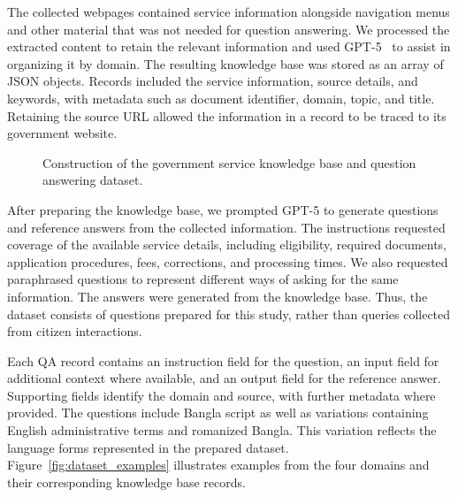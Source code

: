 \documentclass[10pt,journal,compsoc]{IEEEtran}
\begin{document}
The collected webpages contained service information alongside navigation menus and other material that was not needed for question answering. We processed the extracted content to retain the relevant information and used GPT-5~\cite{openai2025gpt5} to assist in organizing it by domain. The resulting knowledge base was stored as an array of JSON objects. Records included the service information, source details, and keywords, with metadata such as document identifier, domain, topic, and title. Retaining the source URL allowed the information in a record to be traced to its government website.

\begin{figure}[!t]
\centering
\caption{Construction of the government service knowledge base and question answering dataset.}
\label{fig:data_preparation}
\end{figure}

After preparing the knowledge base, we prompted GPT-5 to generate questions and reference answers from the collected information. The instructions requested coverage of the available service details, including eligibility, required documents, application procedures, fees, corrections, and processing times. We also requested paraphrased questions to represent different ways of asking for the same information. The answers were generated from the knowledge base. Thus, the dataset consists of questions prepared for this study, rather than queries collected from citizen interactions.

Each QA record contains an instruction field for the question, an input field for additional context where available, and an output field for the reference answer. Supporting fields identify the domain and source, with further metadata where provided. The questions include Bangla script as well as variations containing English administrative terms and romanized Bangla. This variation reflects the language forms represented in the prepared dataset. Figure~\ref{fig:dataset_examples} illustrates examples from the four domains and their corresponding knowledge base records.
\end{document}
